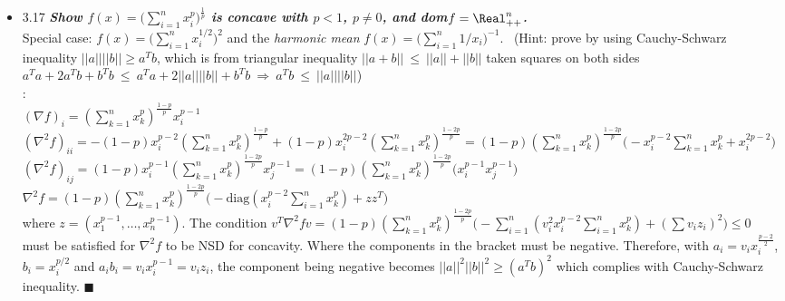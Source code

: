 \begin{itemize}
\item 3.17 {\bf\emph{Show $f(x)= \Big( \sum\limits_{i=1}^{n} x_i^p\Big)^{\frac{1}{p}}$ is concave with
$p<1$, $p\neq 0$, and dom$f=\Real^n_{++}$.}} \\ Special case: $f(x)=\Big(\sum\limits_{i=1}^n
x_i^{1/2} \Big)^2$ and the \emph{harmonic mean} $f(x)=\Big(\sum\limits_{i=1}^n 1/x_i \Big)^{-1}$. \
(Hint: prove by using Cauchy-Schwarz inequality $||a||||b|| \ge a^Tb$, which is from triangular
inequality $||a+b|| \ \le \ ||a||+||b||$ taken squares on both sides $a^Ta+2a^Tb+b^Tb \ \le \
a^Ta+2||a||||b||+b^Tb \ \Rightarrow \ a^Tb \ \le \ ||a||||b||$) \\ \Proof: \\ $(\nabla f)_i=
(\sum\limits_{k=1}^n x_k^p)^{\frac{1-p}{p}}x_i^{p-1}$ \\ $(\nabla^2 f)_{ii} =
-(1-p)x_i^{p-2}(\sum\limits_{k=1}^n x_k^p)^{\frac{1-p}{p}} + (1-p)x_i^{2p-2}(\sum\limits_{k=1}^n
x_k^p)^{\frac{1-2p}{p}} = (1-p)(\sum\limits_{k=1}^n x_k^p)^{\frac{1-2p}{p}} \Big(
-x_i^{p-2}\sum\limits_{k=1}^n x_k^p + x_i^{2p-2}\Big)$ \\
   $(\nabla^2 f)_{ij} = (1-p)x_i^{p-1}(\sum\limits_{k=1}^n x_k^p)^{\frac{1-2p}{p}}x_j^{p-1} =
(1-p)(\sum\limits_{k=1}^n x_k^p)^{\frac{1-2p}{p}} \Big(x_i^{p-1}x_j^{p-1} \Big)$ \\ $\nabla^2 f =
(1-p)(\sum\limits_{k=1}^n x_k^p)^{\frac{1-2p}{p}} \Big(
-\text{diag}(x_i^{p-2}\sum\limits_{i=1}^nx_k^p) + zz^T \Big)$ \\ where $z =
(x_1^{p-1},\dotsc,x_n^{p-1}) $.  The condition $v^T \nabla^2f v = (1-p)(\sum\limits_{k=1}^n
x_k^p)^{\frac{1-2p}{p}} \Big(-\sum\limits_{i=1}^n(v_i^2x_i^{p-2}\sum\limits_{i=1}^nx_k^p) + (\sum
v_iz_i)^2 \Big) \le 0 $ must be satisfied for $\nabla^2 f$ to be NSD for concavity. Where the
components in the bracket must be negative.  Therefore, with $a_i = v_ix_i^{\frac{p-2}{2}}$, $b_i =
x_i^{p/2}$ and $a_ib_i = v_ix_i^{p-1} = v_iz_i$, the component being negative becomes $||a||^2
||b||^2 \ge (a^Tb)^2$ which complies with Cauchy-Schwarz inequality.  $\blacksquare$ \\


\end{itemize}
